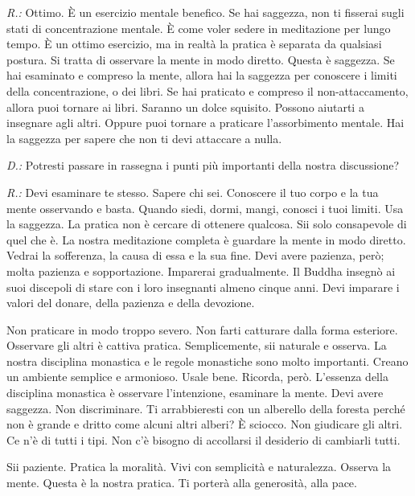 \emph{R.:} Ottimo. È un esercizio mentale benefico. Se hai saggezza, non ti
fisserai sugli stati di concentrazione mentale. È come voler sedere in
meditazione per lungo tempo. È un ottimo esercizio, ma in realtà la
pratica è separata da qualsiasi postura. Si tratta di osservare la mente
in modo diretto. Questa è saggezza. Se hai esaminato e compreso la
mente, allora hai la saggezza per conoscere i limiti della
concentrazione, o dei libri. Se hai praticato e compreso il
non-attaccamento, allora puoi tornare ai libri. Saranno un dolce
squisito. Possono aiutarti a insegnare agli altri. Oppure puoi tornare a
praticare l'assorbimento mentale. Hai la saggezza per sapere che non ti
devi attaccare a nulla.

\emph{D.:} Potresti passare in rassegna i punti più importanti della nostra
discussione?

\emph{R.:} Devi esaminare te stesso. Sapere chi sei. Conoscere il tuo corpo e
la tua mente osservando e basta. Quando siedi, dormi, mangi, conosci i
tuoi limiti. Usa la saggezza. La pratica non è cercare di ottenere
qualcosa. Sii solo consapevole di quel che è. La nostra meditazione
completa è guardare la mente in modo diretto. Vedrai la sofferenza, la
causa di essa e la sua fine. Devi avere pazienza, però; molta pazienza e
sopportazione. Imparerai gradualmente. Il Buddha insegnò ai suoi
discepoli di stare con i loro insegnanti almeno cinque anni. Devi
imparare i valori del donare, della pazienza e della devozione.

Non praticare in modo troppo severo. Non farti catturare dalla forma
esteriore. Osservare gli altri è cattiva pratica. Semplicemente, sii
naturale e osserva. La nostra disciplina monastica e le regole
monastiche sono molto importanti. Creano un ambiente semplice e
armonioso. Usale bene. Ricorda, però. L'essenza della disciplina
monastica è osservare l'intenzione, esaminare la mente. Devi avere
saggezza. Non discriminare. Ti arrabbieresti con un alberello della
foresta perché non è grande e dritto come alcuni altri alberi? È
sciocco. Non giudicare gli altri. Ce n'è di tutti i tipi. Non c'è
bisogno di accollarsi il desiderio di cambiarli tutti.

Sii paziente. Pratica la moralità. Vivi con semplicità e naturalezza.
Osserva la mente. Questa è la nostra pratica. Ti porterà alla
generosità, alla pace.

